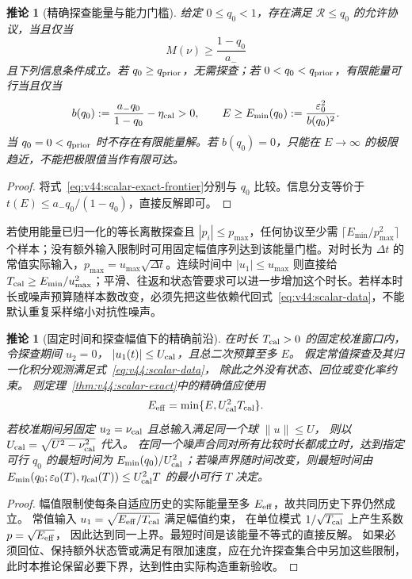 \documentclass[11pt,a4paper]{article}
\numberwithin{equation}{section}
\newtheorem{corollary}[theorem]{推论}
\theoremstyle{definition}
\begin{document}
\begin{corollary}[精确探查能量与能力门槛]
\label{cor:v44:scalar-energy}
给定 $0\le q_0<1$，存在满足 $\mathcal R\le q_0$ 的允许协议，当且仅当
\begin{equation}
 M(\nu)\ge\frac{1-q_0}{a_-}
 \label{eq:v44:scalar-cap-threshold}
\end{equation}
且下列信息条件成立。若 $q_0\ge q_{\rm prior}$，无需探查；若 $0<q_0<q_{\rm prior}$，有限能量可行当且仅当
\[
 b(q_0):=\frac{a_-q_0}{1-q_0}-\eta_{\rm cal}>0,
 \qquad
 E\ge E_{\min}(q_0):=\frac{\varepsilon_0^2}{b(q_0)^2}.
\]
当 $q_0=0<q_{\rm prior}$ 时不存在有限能量解。若 $b(q_0)=0$，只能在 $E\to\infty$ 的极限趋近，不能把极限值当作有限可达。
\end{corollary}
\begin{proof}
将式~\eqref{eq:v44:scalar-exact-frontier}分别与 $q_0$ 比较。信息分支等价于 $t(E)\le a_-q_0/(1-q_0)$，直接反解即可。
\end{proof}

若使用能量已归一化的等长离散探查且 $|p_i|\le p_{\max}$，任何协议至少需 $\lceil E_{\min}/p_{\max}^2\rceil$ 个样本；没有额外输入限制时可用固定幅值序列达到该能量门槛。对时长为 $\Delta t$ 的常值实际输入，$p_{\max}=u_{\max}\sqrt{\Delta t}$。连续时间中 $|u_1|\le u_{\max}$ 则直接给 $T_{\rm cal}\ge E_{\min}/u_{\max}^2$；平滑、往返和状态管要求可以进一步增加这个时长。若样本时长或噪声预算随样本数改变，必须先把这些依赖代回式~\eqref{eq:v44:scalar-data}，不能默认重复采样缩小对抗性噪声。

\begin{corollary}[固定时间和探查幅值下的精确前沿]
\label{cor:v44:scalar-duration}
在时长 $T_{\rm cal}>0$ 的固定校准窗口内，令探查期间 $u_2=0$，
$|u_1(t)|\le U_{\rm cal}$，且总二次预算至多 $E$。
假定常值探查及其归一化积分观测满足式~\eqref{eq:v44:scalar-data}，
除此之外没有状态、回位或变化率约束。
则定理~\ref{thm:v44:scalar-exact}中的精确值应使用
\[
 E_{\rm eff}=\min\{E,U_{\rm cal}^2T_{\rm cal}\}.
\]
若校准期间另固定 $u_2=\nu_{\rm cal}$ 且总输入满足同一个球 $\|u\|\le U$，
则以 $U_{\rm cal}=\sqrt{U^2-\nu_{\rm cal}^2}$ 代入。
在同一个噪声合同对所有比较时长都成立时，达到指定可行 $q_0$ 的最短时间为
$E_{\min}(q_0)/U_{\rm cal}^2$；若噪声界随时间改变，则最短时间由
$E_{\min}(q_0;\varepsilon_0(T),\eta_{\rm cal}(T))\le U_{\rm cal}^2T$
的最小可行 $T$ 决定。
\end{corollary}
\begin{proof}
幅值限制使每条自适应历史的实际能量至多 $E_{\rm eff}$，故共同历史下界仍然成立。
常值输入 $u_1=\sqrt{E_{\rm eff}/T_{\rm cal}}$ 满足幅值约束，
在单位模式 $1/\sqrt{T_{\rm cal}}$ 上产生系数 $p=\sqrt{E_{\rm eff}}$，
因此达到同一上界。最短时间是该能量不等式的直接反解。
如果必须回位、保持额外状态管或满足有限加速度，应在允许探查集合中另加这些限制，
此时本推论保留必要下界，达到性由实际构造重新验收。
\end{proof}
\end{document}
